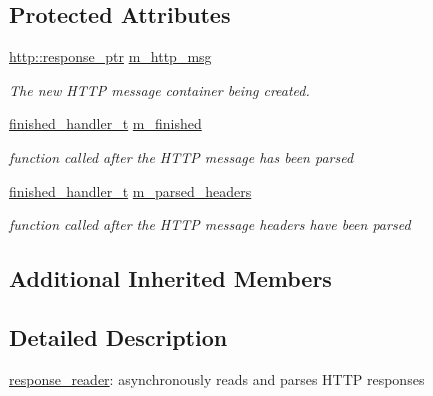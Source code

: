 \subsection*{Protected Attributes}
\begin{DoxyCompactItemize}
\item 
\hyperlink{namespacepion_1_1http_af92bc593f2514fe8733175dafec7cd33}{http\-::response\-\_\-ptr} \hyperlink{classpion_1_1http_1_1response__reader_ac06fea6a8b6b5383dacd99c313b6f77d}{m\-\_\-http\-\_\-msg}
\begin{DoxyCompactList}\small\item\em The new H\-T\-T\-P message container being created. \end{DoxyCompactList}\item 
\hyperlink{classpion_1_1http_1_1response__reader_a5ca8a2f566ad6c5f6c6ae264d557944e}{finished\-\_\-handler\-\_\-t} \hyperlink{classpion_1_1http_1_1response__reader_aff7c50ffd2cb1748620b6051d8f9233c}{m\-\_\-finished}
\begin{DoxyCompactList}\small\item\em function called after the H\-T\-T\-P message has been parsed \end{DoxyCompactList}\item 
\hyperlink{classpion_1_1http_1_1response__reader_a5ca8a2f566ad6c5f6c6ae264d557944e}{finished\-\_\-handler\-\_\-t} \hyperlink{classpion_1_1http_1_1response__reader_a1671bc073f332ea3c14a09af89c99c83}{m\-\_\-parsed\-\_\-headers}
\begin{DoxyCompactList}\small\item\em function called after the H\-T\-T\-P message headers have been parsed \end{DoxyCompactList}\end{DoxyCompactItemize}
\subsection*{Additional Inherited Members}


\subsection{Detailed Description}
\hyperlink{classpion_1_1http_1_1response__reader}{response\-\_\-reader}\-: asynchronously reads and parses H\-T\-T\-P responses 

